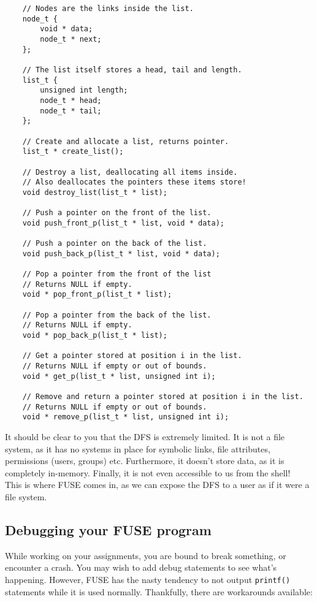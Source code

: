 \documentclass [a4,twoside,11pt] {article}
\begin{document}
    \begin{verbatim}
    // Nodes are the links inside the list.
    node_t {
        void * data;
        node_t * next;
    };

    // The list itself stores a head, tail and length.
    list_t {
        unsigned int length;
        node_t * head;
        node_t * tail;
    };

    // Create and allocate a list, returns pointer.
    list_t * create_list();

    // Destroy a list, deallocating all items inside.
    // Also deallocates the pointers these items store!
    void destroy_list(list_t * list);

    // Push a pointer on the front of the list.
    void push_front_p(list_t * list, void * data);

    // Push a pointer on the back of the list.
    void push_back_p(list_t * list, void * data);

    // Pop a pointer from the front of the list
    // Returns NULL if empty.
    void * pop_front_p(list_t * list);

    // Pop a pointer from the back of the list.
    // Returns NULL if empty.
    void * pop_back_p(list_t * list);

    // Get a pointer stored at position i in the list.
    // Returns NULL if empty or out of bounds.
    void * get_p(list_t * list, unsigned int i);

    // Remove and return a pointer stored at position i in the list. 
    // Returns NULL if empty or out of bounds.
    void * remove_p(list_t * list, unsigned int i);\end{verbatim}

    It should be clear to you that the DFS is extremely limited. It is not a file system, as it has no systems in place for symbolic links, file attributes, permissions (users, groups) etc. Furthermore, it doesn't store data, as it is completely in-memory. Finally, it is not even accessible to us from the shell!\\ 
    
    This is where FUSE comes in, as we can expose the DFS to a user as if it were a file system.

    \subsection{Debugging your FUSE program}

    While working on your assignments, you are bound to break something, or encounter a crash. You may wish to add debug statements to see what's happening. However, FUSE has the nasty tendency to not output \texttt{printf()} statements while it is used normally. Thankfully, there are workarounds available:
    
\end{document}

